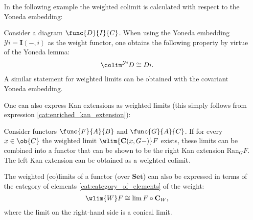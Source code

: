     In the following example the weighted colimit is calculated with respect to the Yoneda embedding:
    \begin{example}
        Consider a diagram $\func{D}{I}{C}$. When using the Yoneda embedding $\mathcal{Y}i = \mathbf{I}(-,i)$ as the weight functor, one obtains the following property by virtue of the Yoneda lemma:
        \begin{gather}
            \label{cat:weighted_hom_colimit}
            \colim^{\mathcal{Y}i}D\cong Di.
        \end{gather}
        A similar statement for weighted limits can be obtained with the covariant Yoneda embedding.
    \end{example}

    One can also express Kan extensions as weighted limits (this simply follows from expression \ref{cat:enriched_kan_extension}):
    \begin{property}
        Consider functors $\func{F}{A}{B}$ and $\func{G}{A}{C}$. If for every $x\in\ob{C}$ the weighted limit $\wlim{\mathbf{C}(x,G-)}F$ exists, these limits can be combined into a functor that can be shown to be the right Kan extension $\mathrm{Ran}_GF$. The left Kan extension can be obtained as a weighted colimit.
    \end{property}

    \begin{property}
        The weighted (co)limits of a functor (over $\mathbf{Set}$) can also be expressed in terms of the category of elements \ref{cat:category_of_elements} of the weight:
        \begin{gather}
            \wlim{W}F\cong\lim F\circ\mathbf{C}_W,
        \end{gather}
        where the limit on the right-hand side is a conical limit.
    \end{property}

